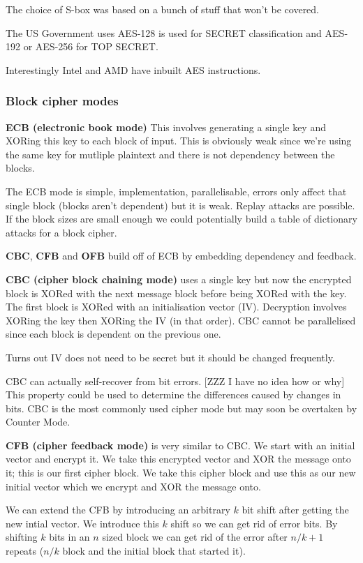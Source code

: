 \documentclass{report}
\begin{document}
The choice of S-box was based on a bunch of stuff that won't be covered.

The US Government uses
AES-128 is used for SECRET classification and
AES-192 or AES-256 for TOP SECRET\@.

Interestingly Intel and AMD have inbuilt AES instructions.

\subsubsection{Block cipher modes}
\textbf{ECB (electronic book mode)}
This involves generating a single key and XORing this key to each block of
input. This is obviously weak since we're using the same key for mutliple
plaintext and there is not dependency between the blocks.

The ECB mode is simple, implementation, parallelisable,
errors only affect that single block (blocks aren't dependent) but it is weak.
Replay attacks are possible. If the block sizes are small enough we could
potentially build a table of dictionary attacks for a block cipher.

\textbf{CBC}, \textbf{CFB} and \textbf{OFB} build off of ECB by embedding
dependency and feedback.

\textbf{CBC (cipher block chaining mode)} uses a single key but now the
encrypted block is XORed with the next message
block before being XORed with the key. The first block is XORed with an
initialisation vector (IV). Decryption involves XORing the key then XORing the
IV (in that order). CBC cannot be parallelised since each block is dependent on
the previous one.

Turns out IV does not need to be secret but it should be changed frequently.

CBC can actually self-recover from bit errors. [ZZZ I have no idea how or why]
This property could be used to determine the
differences caused by changes in bits.
CBC is the most commonly used cipher mode but may soon be overtaken by Counter
Mode.

\textbf{CFB (cipher feedback mode)} is very similar to CBC\@.
We start with an initial
vector and encrypt it. We take this encrypted vector and XOR the message onto
it; this is our first cipher block. We take this cipher block and use this as
our new initial vector which we encrypt and XOR the message onto.

We can extend the CFB by introducing an arbitrary $k$ bit shift after getting
the
new intial vector. We introduce this $k$ shift so we can get rid of error bits.
By shifting $k$ bits in an $n$ sized block we can get rid of the error after
$n/k + 1$ repeats ($n/k$ block and the initial block that started it).
\end{document}
